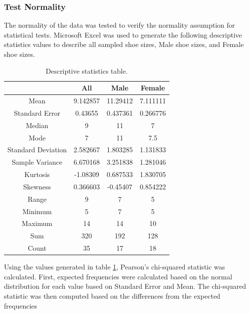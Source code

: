 \subsubsection{Test Normality}
The normality of the data was tested to verify the normality assumption for statistical tests. Microsoft Excel was used to generate the following descriptive statistics values to describe all sampled shoe sizes, Male shoe sizes, and Female shoe sizes.

\begin{longtable}{|c|c|c|c|}
\caption{\label{tab:DescriptiveStats}Descriptive statistics table.}\\
\hline
\cellcolor{gray} & All & Male & Female \\
\hline
Mean & 9.142857 & 11.29412 & 7.111111 \\
Standard Error & 0.43655 & 0.437361 & 0.266776 \\
Median & 9 & 11 & 7 \\
Mode & 7 & 11 & 7.5 \\
Standard Deviation & 2.582667 & 1.803285 & 1.131833 \\
Sample Variance & 6.670168 & 3.251838 & 1.281046 \\
Kurtosis & -1.08309 & 0.687533 & 1.830705 \\
Skewness & 0.366603 & -0.45407 & 0.854222 \\
Range & 9 & 7 & 5 \\
Minimum & 5 & 7 & 5 \\
Maximum & 14 & 14 & 10 \\
Sum & 320 & 192 & 128 \\
Count & 35 & 17 & 18 \\
\hline
\end{longtable}
\par
Using the values generated in table \cref{tab:DescriptiveStats}, Pearson's chi-squared statistic was calculated. First, expected frequencies were calculated based on the normal distribution for each value based on Standard Error and Mean. The chi-squared statistic was then computed based on the differences from the expected frequencies


